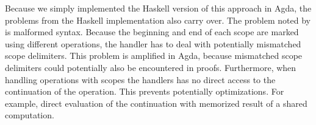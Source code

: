 Because we simply implemented the Haskell version of this approach in Agda, the
problems from the Haskell implementation also carry over.
The problem noted by \textcite{DBLP:conf/haskell/WuSH14} is malformed syntax.
Because the beginning and end of each scope are marked using different
operations, the handler has to deal with potentially mismatched scope delimiters.
This problem is amplified in Agda, because mismatched scope delimiters could
potentially also be encountered in proofs.
Furthermore, when handling operations with scopes the handlers has no direct
access to the continuation of the operation.
This prevents potentially optimizations.
For example, direct evaluation of the continuation with memorized result of a
shared computation.
